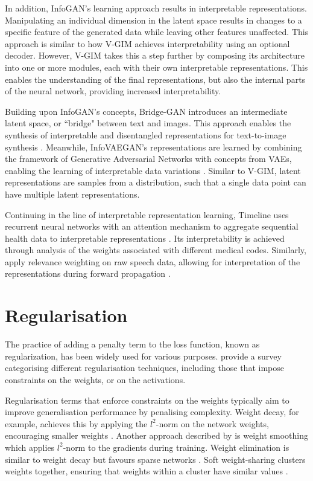 	In addition, InfoGAN's learning approach results in interpretable representations. Manipulating an individual dimension in the latent space results in changes to a specific feature of the generated data while leaving other features unaffected. This approach is similar to how V-GIM achieves interpretability using an optional decoder. However, V-GIM takes this a step further by composing its architecture into one or more modules, each with their own interpretable representations. This enables the understanding of the final representations, but also the internal parts of the neural network, providing increased interpretability.
	
	Building upon InfoGAN's concepts, Bridge-GAN introduces an intermediate latent space, or ``bridge" between text and images. This approach enables the synthesis of interpretable and disentangled representations for text-to-image synthesis \citep{yuanBridgeGANInterpretableRepresentation2020}. Meanwhile, InfoVAEGAN's representations are learned by combining the framework of Generative Adversarial Networks with concepts from VAEs, enabling the learning of interpretable data variations \citep{yeInfoVAEGANLearningJoint2021}. Similar to V-GIM, latent representations are samples from a distribution, such that a single data point can have multiple latent representations.
	
	Continuing in the line of interpretable representation learning, Timeline uses recurrent neural networks with an attention mechanism to aggregate sequential health data to interpretable representations \citep{baiInterpretableRepresentationLearning2018}. Its interpretability is achieved through analysis of the weights associated with different medical codes. Similarly, \cite{agrawalInterpretableRepresentationLearning2020} apply relevance weighting on raw speech data, allowing for interpretation of the representations during forward propagation . 
	
	
	

\section{Regularisation}
	The practice of adding a penalty term to the loss function, known as regularization, has been widely used for various purposes. \cite{kukackaRegularizationDeepLearning2017} provide a survey categorising different regularisation techniques, including those that impose constraints on the weights, or on the activations.
	
	Regularisation terms that enforce constraints on the weights typically aim to improve generalisation performance by penalising complexity. Weight decay, for example, achieves this by applying the $l^2$-norm on the network weights, encouraging smaller weights \citep{gneccoWeightdecayTechniqueLearning2009}. Another approach described by \cite{kukackaRegularizationDeepLearning2017} is weight smoothing which applies $l^2$-norm to the gradients during training. Weight elimination is similar to weight decay but favours sparse networks \citep{weigendGeneralizationWeightEliminationApplication1990}. Soft weight-sharing clusters weights together, ensuring that weights within a cluster have similar values \citep{nowlanSimplifyingNeuralNetworks1992}.
	
